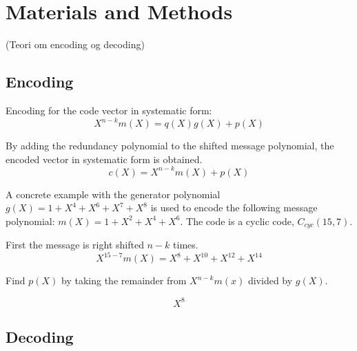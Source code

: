 \documentclass[Main]{subfiles}
\begin{document}
\section{Materials and Methods}

(Teori om encoding og decoding)
\subsection{Encoding}

\noindent Encoding for the code vector in systematic form:
\begin{equation}
X^{n-k}m(X) = q(X)g(X)+p(X)
\end{equation}

\noindent By adding the redundancy polynomial to the shifted message polynomial, the encoded vector in systematic form is obtained.
\begin{equation}
c(X) = X^{n-k}m(X)+p(X)
\end{equation}

\noindent A concrete example with the generator polynomial $g(X)=1+X^4+X^6+X^7+X^8$ is used to encode the following message polynomial:
$m(X)=1+X^2+X^4+X^6$. The code is a cyclic code, $C_{cyc}(15,7)$.

\noindent First the message is right shifted $n-k$ times.
\begin{equation}
X^{15-7}m(X) = X^8+X^{10}+X^{12}+X^{14}
\end{equation}

\noindent Find $p(X)$ by taking the remainder from $X^{n-k}m(x)$ divided by $g(X)$.

\begin{equation}
X^8
\end{equation}


\subsection{Decoding}
\end{document}
